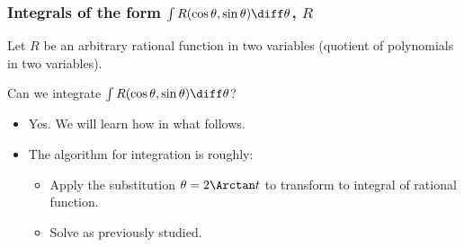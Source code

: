 \begin{frame}
\frametitle{Integrals of the form $\int R(\cos \theta,\sin \theta) \diff \theta$, $R$}

Let $R$ be an arbitrary rational function in two variables (quotient of polynomials in two variables).
\begin{question}
Can we integrate $\int R(\cos \theta, \sin \theta)\diff \theta$?
\end{question}
\begin{itemize}
\item<2-> Yes. We will learn how in what follows.
\item<3-> The algorithm for integration is roughly:
\begin{itemize}
\item<4-> Apply the substitution $\theta=2\Arctan t$ to transform to integral of rational function.
\item<5-> Solve as previously studied.
\end{itemize}
\end{itemize}
\end{frame}

